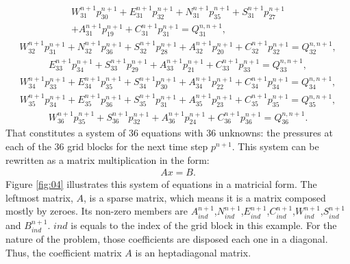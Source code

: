 \begin{multline}
\label{solution32}
W^{n+1}_{31}p^{n+1}_{30}+E^{n+1}_{31}p^{n+1}_{32}+N^{n+1}_{31}p^{n+1}_{35}+S^{n+1}_{31}p^{n+1}_{27}\\+A^{n+1}_{31}p^{n+1}_{19}+C^{n+1}_{31}p^{n+1}_{31}=Q^{n, n+1}_{31},
\end{multline}
\begin{multline}
\label{solution33}
W^{n+1}_{32}p^{n+1}_{31}+N^{n+1}_{32}p^{n+1}_{36}+S^{n+1}_{32}p^{n+1}_{28}+A^{n+1}_{32}p^{n+1}_{20}+C^{n+1}_{32}p^{n+1}_{32}=Q^{n, n+1}_{32},
\end{multline}
\begin{multline}
\label{solution34}
E^{n+1}_{33}p^{n+1}_{34}+S^{n+1}_{33}p^{n+1}_{29}+A^{n+1}_{33}p^{n+1}_{21}+C^{n+1}_{33}p^{n+1}_{33}=Q^{n, n+1}_{33},
\end{multline}
\begin{multline}
\label{solution35}
W^{n+1}_{34}p^{n+1}_{33}+E^{n+1}_{34}p^{n+1}_{35}+S^{n+1}_{34}p^{n+1}_{30}+A^{n+1}_{34}p^{n+1}_{22}+C^{n+1}_{34}p^{n+1}_{34}=Q^{n, n+1}_{34},
\end{multline}
\begin{multline}
\label{solution36}
W^{n+1}_{35}p^{n+1}_{34}+E^{n+1}_{35}p^{n+1}_{36}+S^{n+1}_{35}p^{n+1}_{31}+A^{n+1}_{35}p^{n+1}_{23}+C^{n+1}_{35}p^{n+1}_{35}=Q^{n, n+1}_{35},
\end{multline}
\begin{multline}
\label{solution37}
W^{n+1}_{36}p^{n+1}_{35}+S^{n+1}_{36}p^{n+1}_{32}+A^{n+1}_{36}p^{n+1}_{24}+C^{n+1}_{36}p^{n+1}_{36}=Q^{n, n+1}_{36}.
\end{multline}
That constitutes a system of 36 equations with 36 unknowns: the pressures at each of the 36 grid blocks for the next time step $p^{n+1}$. This system can be rewritten as a matrix multiplication in the form:
\begin{align}
\label{solution38}
A x = B.
\end{align}
Figure \ref{fig:04} illustrates this system of equations in a matricial form. The leftmost matrix, $A$, is a sparse matrix, which means it is a matrix composed mostly by zeroes. Its non-zero members are $A^{n+1}_{ind}$,$N^{n+1}_{ind}$,$E^{n+1}_{ind}$,$C^{n+1}_{ind}$,$W^{n+1}_{ind}$,$S^{n+1}_{ind}$ and $B^{n+1}_{ind}$. $ind$ is equals to the index of the grid block in this example. For the nature of the problem, those coefficients are disposed each one in a diagonal. Thus, the coefficient matrix $A$ is an heptadiagonal matrix.
